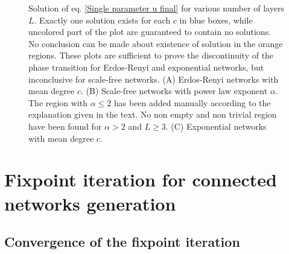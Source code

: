 \documentclass[
11pt, %
english, %
singlespacing, %
nolistspacing, %
liststotoc, %
headsepline, %
]{MastersDoctoralThesis} %
\begin{document}
{\begin{figure}
	\caption{Solution of eq. \eqref{Single parameter u final} for various number of layers $L$. Exactly one solution exists for each $c$ in blue boxes, while uncolored part of the plot are guaranteed to contain no solutions. No conclusion can be made about existence of solution in the orange regions. These plots are sufficient to prove the discontinuity of the phase transition for Erdos-Renyi and exponential networks, but inconclusive for scale-free networks. (A) Erdos-Renyi networks with mean degree $c$. (B) Scale-free networks with power law exponent $\alpha$. The region with $\alpha \leq 2$ has been added manually according to the explanation given in the text. No non empty and non trivial region have been found for $\alpha > 2$ and $L \geq 3$. (C) Exponential networks with mean degree $c$.}
	\label{Figure: Multilayer single parameter}
\end{figure}
}


\appendix  %

\chapter{Fixpoint iteration for connected networks generation}
\section{Convergence of the fixpoint iteration}
\label{Appendix: Fixpoint convergence}
\end{document}
